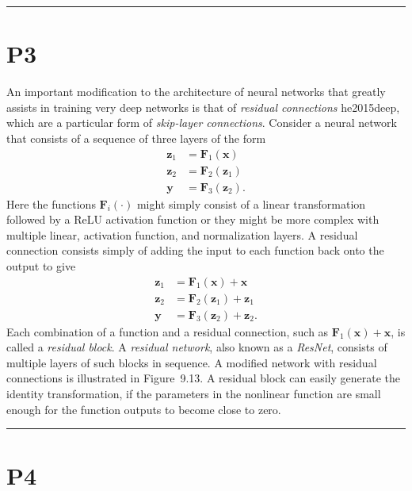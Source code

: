 \documentclass{article}
\begin{document}
\noindent\rule{\linewidth}{0.4pt}

\section{P3}

An important modification to the architecture of neural networks that greatly assists in training very deep networks is that of \emph{residual connections} {he2015deep}, which are a particular form of \emph{skip-layer connections}. Consider a neural network that consists of a sequence of three layers of the form
\begin{align}
    \mathbf{z}_1 &= \mathbf{F}_1(\mathbf{x}) \label{eq:resnet-z1} \\
    \mathbf{z}_2 &= \mathbf{F}_2(\mathbf{z}_1) \label{eq:resnet-z2} \\
    \mathbf{y}   &= \mathbf{F}_3(\mathbf{z}_2). \label{eq:resnet-y}
\end{align}
Here the functions $\mathbf{F}_i(\cdot)$ might simply consist of a linear transformation followed by a ReLU activation function or they might be more complex with multiple linear, activation function, and normalization layers. A residual connection consists simply of adding the input to each function back onto the output to give
\begin{align}
    \mathbf{z}_1 &= \mathbf{F}_1(\mathbf{x}) + \mathbf{x} \label{eq:resblock-1} \\
    \mathbf{z}_2 &= \mathbf{F}_2(\mathbf{z}_1) + \mathbf{z}_1 \label{eq:resblock-2} \\
    \mathbf{y}   &= \mathbf{F}_3(\mathbf{z}_2) + \mathbf{z}_2. \label{eq:resblock-3}
\end{align}
Each combination of a function and a residual connection, such as $\mathbf{F}_1(\mathbf{x}) + \mathbf{x}$, is called a \emph{residual block}. A \emph{residual network}, also known as a \emph{ResNet}, consists of multiple layers of such blocks in sequence. A modified network with residual connections is illustrated in Figure~9.13. A residual block can easily generate the identity transformation, if the parameters in the nonlinear function are small enough for the function outputs to become close to zero.

\noindent\rule{\linewidth}{0.4pt}

\section{P4}
\end{document}

